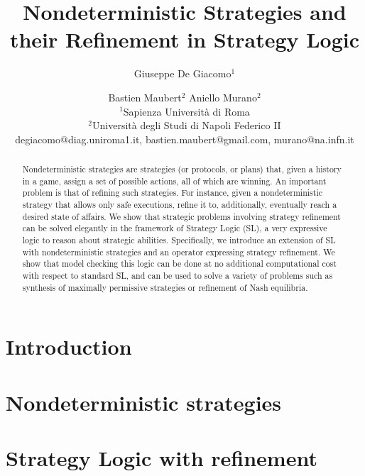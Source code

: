 \documentclass{article}
\title{Nondeterministic Strategies and their Refinement in Strategy Logic}
\author{
 Giuseppe De Giacomo$^1$\and
 Bastien Maubert$^2$\And
  Aniello Murano$^2$\\
 	\affiliations
 	$^1$Sapienza Università di Roma\\
 	$^2$Universit\`a degli Studi di Napoli Federico II\\
 	\emails
 	degiacomo@diag.uniroma1.it,
 	bastien.maubert@gmail.com,
 	murano@na.infn.it
}
\theoremstyle{definition}
\theoremstyle{plain}
\begin{document}
\maketitle

\begin{abstract}
  Nondeterministic strategies are strategies (or protocols, or plans)
  that, given a history in a game, assign a set of possible actions,
  all of which are winning.  An important problem is that of refining
  such strategies. For instance, given a nondeterministic strategy
  that allows only safe executions, refine it to, additionally,
  eventually reach a desired state of affairs. We show that strategic
  problems involving strategy refinement can be solved elegantly in the framework of Strategy Logic
  (SL), a very expressive logic to reason about strategic
  abilities. Specifically, we introduce an extension of SL with
  nondeterministic strategies and an operator expressing  strategy refinement. We
  show that model checking this logic can be done at no additional
  computational cost with respect to standard SL, and can be used to
  solve a variety of problems such as  synthesis of maximally permissive
  strategies or
  refinement of Nash equilibria.
\end{abstract}

\section{Introduction}
\label{section:introduction}


\section{Nondeterministic strategies}
\label{section:refinement}






\section{Strategy Logic with refinement}
\label{section:SL}



% 
\end{document}
